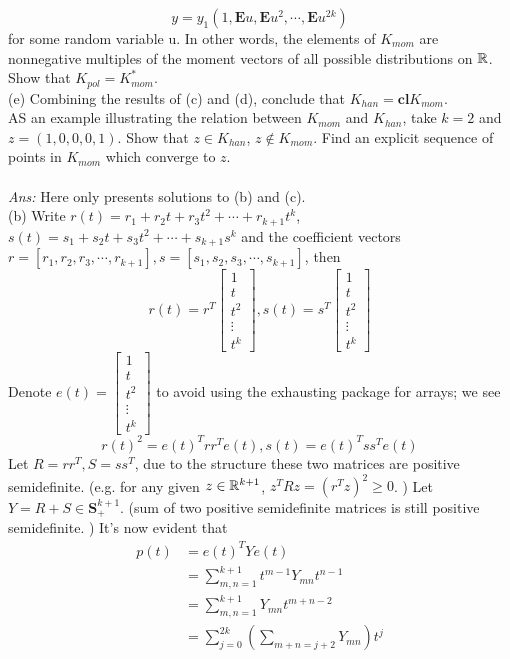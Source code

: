 \documentclass[12pt,a4paper]{article}
\renewcommand{\l}{\left}\renewcommand{\r}{\right}
\newcommand{\SUM}[2]{\sum\limits_{#1}^{#2}}
\def\R{\ifmmode\mathbb R\fi}
\def\vE{\mathbf{E}}
\def\vS{\mathbf{S}}
\begin{document}
$$y = y_1 (1, \vE u, \vE u^2, \cdots , \vE u^{2k})$$
for some random variable u. In other words, the elements of $K_{mom}$ are nonnegative multiples of the moment vectors of all possible distributions on $\R$. Show that $K_{pol} = K_{mom}^\ast$. \\
(e) Combining the results of (c) and (d), conclude that $K_{han} = \mathbf{cl}K_{mom}$. \\
AS an example illustrating the relation between $K_{mom}$ and $K_{han}$, take $k=2$ and $z=(1,0,0,0,1)$. Show that $z\in K_{han}$, $z\notin K_{mom}$. Find an explicit sequence of points in $K_{mom}$ which converge to $z$. \\
\\
{\it Ans:} Here only presents solutions to (b) and (c).\\
(b) Write $r(t) = r_1+r_2t +r_3t^2+\cdots+r_{k+1}t^k$, $s(t) = s_1+s_2t+s_3t^2+\cdots+s_{k+1}s^k$ and the coefficient vectors $r = [r_1, r_2, r_3, \cdots, r_{k+1}], s = [s_1, s_2, s_3, \cdots, s_{k+1}]$, then 
$$r(t) = r^T\l[\begin{array}{c}
1\\
t\\
t^2\\
\vdots\\
t^k\end{array}\r], s(t) = s^T\l[\begin{array}{c}
1\\
t\\
t^2\\
\vdots\\
t^k\end{array}\r]$$
Denote $e(t) = \l[\begin{array}{c}
1\\
t\\
t^2\\
\vdots\\
t^k\end{array}\r]$ to avoid using the exhausting package for arrays; we see 
$$r(t)^2 = e(t)^T r r^T e(t), s(t) = e(t)^T s s^T e(t)$$
Let $R = rr^T, S = ss^T$, due to the structure these two matrices are positive semidefinite. (e.g. for any given $z\in\R^{k+1}$, $z^T R z = (r^T z)^2 \geq 0$. ) Let $Y = R+S \in \vS^{k+1}_+$. (sum of two positive semidefinite matrices is still positive semidefinite. ) It's now evident that 
\begin{align*}
p(t) &= e(t)^T Y e(t) \\
&= \SUM{m,n=1}{k+1} t^{m-1}Y_{mn}t^{n-1} \\
&= \SUM{m,n=1}{k+1} Y_{mn} t^{m+n-2} \\
&= \SUM{j=0}{2k} \l(\SUM{m+n=j+2}{} Y_{mn}\r) t^j
\end{align*}
\end{document}
